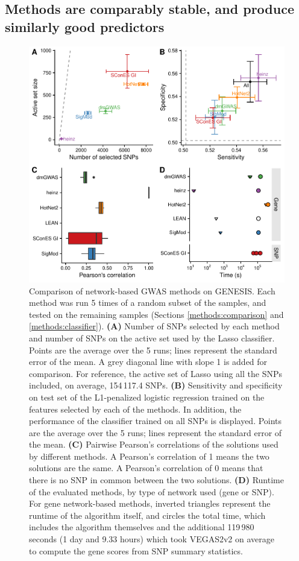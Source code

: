 \documentclass[twocolumn, 11pt, draft]{article}
\begin{document}
\subsection{Methods are comparably stable, and produce similarly good predictors}

\begin{figure}[htbp]
\centering
\includegraphics[width=.8\linewidth]{./figures/figure_4.pdf}
\caption{\label{fig:benchmark}
Comparison of network-based GWAS methods on GENESIS. Each method was run 5 times of a random subset of the samples, and tested on the remaining samples (Sections \ref{methods:comparison} and \ref{methods:classifier}). \textbf{(A)} Number of SNPs selected by each method and number of SNPs on the active set used by the Lasso classifier. Points are the average over the 5 runs; lines represent the standard error of the mean. A grey diagonal line with slope 1 is added for comparison. For reference, the active set of Lasso using all the SNPs included, on average, 154\,117.4 SNPs. \textbf{(B)} Sensitivity and specificity on test set of the L1-penalized logistic regression trained on the features selected by each of the methods. In addition, the performance of the classifier trained on all SNPs is displayed. Points are the average over the 5 runs; lines represent the standard error of the mean. \textbf{(C)} Pairwise Pearson's correlations of the solutions used by different methods. A Pearson's correlation of 1 means the two solutions are the same. A Pearson's correlation of 0 means that there is no SNP in common between the two solutions. \textbf{(D)} Runtime of the evaluated methods, by type of network used (gene or SNP). For gene network-based methods, inverted triangles represent the runtime of the algorithm itself, and circles the total time, which includes the algorithm themselves and the additional 119\,980 seconds (1 day and 9.33 hours) which took VEGAS2v2 on average to compute the gene scores from SNP summary statistics.}
\end{figure}
\end{document}
